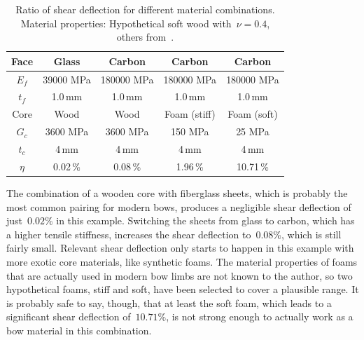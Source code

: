\begin{table}[h!]
\centering
\begin{tabular}{| c | c c c c |}
\hline
Face & Glass & Carbon & Carbon & Carbon \\
\hline
$E_f$ & 39000 MPa & 180000 MPa & 180000 MPa & 180000 MPa \\
$t_f$ & 1.0\,\unit{mm} & 1.0\,\unit{mm} & 1.0\,\unit{mm} & 1.0\,\unit{mm} \\
\hline
Core & Wood & Wood & Foam (stiff) & Foam (soft) \\
\hline
$G_c$ & 3600 MPa & 3600 MPa & 150 MPa & 25 MPa \\
$t_c$ & 4\,\unit{mm} & 4\,\unit{mm} & 4\,\unit{mm} & 4\,\unit{mm} \\
\hline
$\eta$ & 0.02\,\% & 0.08\,\% & 1.96\,\% & 10.71\,\% \\
\hline
\end{tabular}
\caption{Ratio of shear deflection for different material combinations. Material properties: Hypothetical soft wood with~$\nu = 0.4$, others from~\cite{bib:zenkert1995}.}
\label{tbl:material-shear-ratio}
\end{table}

%
%
%
%
%
%
%

The combination of a wooden core with fiberglass sheets, which is probably the most common pairing for modern bows, produces a negligible shear deflection of just~$0.02\%$ in this example.
Switching the sheets from glass to carbon, which has a higher tensile stiffness, increases the shear deflection to~$0.08\%$, which is still fairly small.
Relevant shear deflection only starts to happen in this example with more exotic core materials, like synthetic foams.
The material properties of foams that are actually used in modern bow limbs are not known to the author, so two hypothetical foams, stiff and soft, have been selected to cover a plausible range.
It is probably safe to say, though, that at least the soft foam, which leads to a significant shear deflection of~$10.71\%$, is not strong enough to actually work as a bow material in this combination.

